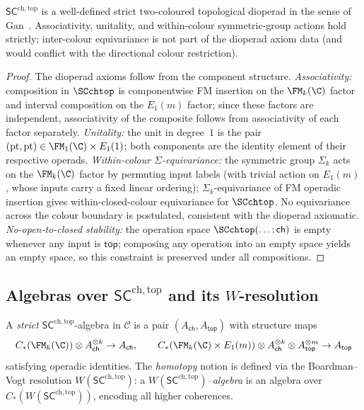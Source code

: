 \begin{proposition}[\ClaimStatusProvedHere]
\label{prop:SC-operad}
$\mathsf{SC}^{\mathrm{ch,top}}$ is a well-defined strict
two-coloured topological dioperad in the sense of
Gan~\cite{Gan03}. Associativity, unitality, and within-colour
symmetric-group actions hold strictly; inter-colour equivariance is
not part of the dioperad axiom data (and would conflict with the
directional colour restriction).
\end{proposition}

\begin{proof}
The dioperad axioms follow from the component structure.
\emph{Associativity:} composition in $\SCchtop$ is componentwise FM insertion on the $\FM_k(\C)$ factor and interval composition on the $E_1(m)$ factor; since these factors are independent, associativity of the composite follows from associativity of each factor separately.
\emph{Unitality:} the unit in degree~$1$ is the pair $(\mathrm{pt},\mathrm{pt}) \in \FM_1(\C) \times E_1(1)$; both components are the identity element of their respective operads.
\emph{Within-colour $\Sigma$-equivariance:} the symmetric group $\Sigma_k$ acts on the $\FM_k(\C)$ factor by permuting input labels (with trivial action on $E_1(m)$, whose inputs carry a fixed linear ordering); $\Sigma_k$-equivariance of FM operadic insertion gives within-closed-colour equivariance for $\SCchtop$. No equivariance across the colour boundary is postulated, consistent with the dioperad axiomatic.
\emph{No-open-to-closed stability:} the operation space $\SCchtop(\ldots;\mathsf{ch})$ is empty whenever any input is $\mathsf{top}$; composing any operation into an empty space yields an empty space, so this constraint is preserved under all compositions.
\end{proof}

\subsection{Algebras over $\mathsf{SC}^{\mathrm{ch,top}}$ and its $W$-resolution}
\label{subsec:WSC-alg}
\begin{definition}
\label{def:SC-alg}
A \emph{strict} $\mathsf{SC}^{\mathrm{ch,top}}$-algebra in $\mathcal C$ is a pair $(A_{\mathsf{ch}},A_{\mathsf{top}})$ with structure maps
\[
C_\ast(\FM_k(\C))\otimes A_{\mathsf{ch}}^{\otimes k}\to A_{\mathsf{ch}},\qquad
C_\ast(\FM_k(\C)\times E_1(m))\otimes A_{\mathsf{ch}}^{\otimes k}\otimes A_{\mathsf{top}}^{\otimes m}\to A_{\mathsf{top}}
\]
satisfying operadic identities. The \emph{homotopy} notion is defined via the Boardman--Vogt resolution $W(\mathsf{SC}^{\mathrm{ch,top}})$: a \emph{$W(\mathsf{SC}^{\mathrm{ch,top}})$–algebra} is an algebra over $C_\ast(W(\mathsf{SC}^{\mathrm{ch,top}}))$, encoding all higher coherences.
\end{definition}

